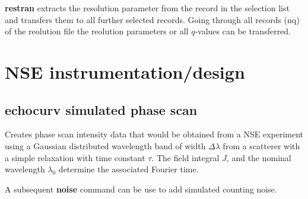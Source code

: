 \documentclass[11pt,fleqn]{book} %
\newcommand{\desc}[1]{\hskip 0.5cm {\color{descgray} #1}}
\begin{document}
\textbf{restran} extracts the resolution parameter from the record in the selection list and
transfers them to all further selected records. Going through all records (nq) of the 
reolution file the reolution parameters or all $q$-values can be transferred.



 




\chapter{NSE instrumentation/design}

\section{echocurv \desc{simulated phase scan}}


\begin{exercise}
Creates phase scan intensity data that would be obtained from a NSE experiment using
a Gaussian distributed wavelength band of width ${\Delta \lambda}$ from a scatterer with
a simple relaxation with time constant ${\tau}$. 
The field integral ${J}$, and the nominal wavelength ${\lambda_0}$ determine the associated  Fourier time.

A subsequent {\bf noise} command can be use to add simulated counting noise. 
\end{exercise}
\end{document}
